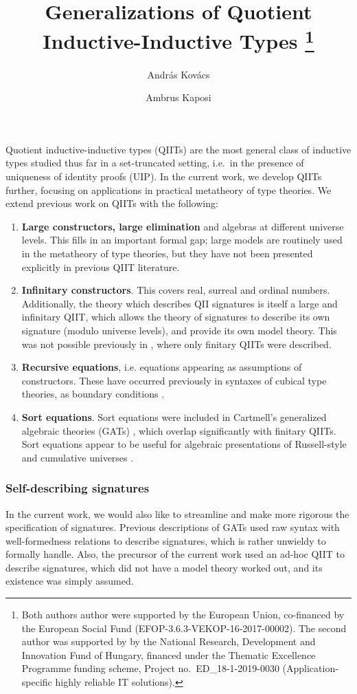 \documentclass{easychair}
\title{Generalizations of Quotient Inductive-Inductive Types %
  \thanks{Both authors author were supported by the European Union, co-financed
    by the European Social Fund (EFOP-3.6.3-VEKOP-16-2017-00002). The second
    author was supported by by the National Research, Development and Innovation
    Fund of Hungary, financed under the Thematic Excellence Programme funding
    scheme, Project no.\ ED\_18-1-2019-0030 (Application-specific highly
    reliable IT solutions). }}
\author{
Andr\'as Kov\'acs
\and
Ambrus Kaposi
}
\institute{
  E\"otv\"os Lor\'and University,
  Budapest, Hungary \\
  \email{kovacsandras|akaposi@inf.elte.hu}
}
\begin{document}
\maketitle

Quotient inductive-inductive types (QIITs) are the most general class of
inductive types studied thus far in a set-truncated setting, i.e.\ in the
presence of uniqueness of identity proofs (UIP). In the current work, we develop
QIITs further, focusing on applications in practical metatheory of type
theories. We extend previous work on QIITs \cite{kaposi2019constructing} with
the following:
\begin{enumerate}
  \item
  \textbf{Large constructors, large elimination} and algebras at different
  universe levels. This fills in an important formal gap; large models are
  routinely used in the metatheory of type theories, but they have not been
  presented explicitly in previous QIIT literature.
  \item
  \textbf{Infinitary constructors}.
  This covers real, surreal \cite{HoTTbook} and ordinal numbers. Additionally,
  the theory which describes QII signatures is itself a large and infinitary
  QIIT, which allows the theory of signatures to describe its own signature
  (modulo universe levels), and provide its own model theory. This was not
  possible previously in \cite{kaposi2019constructing}, where only finitary
  QIITs were described.
  \item
  \textbf{Recursive equations}, i.e. equations appearing as assumptions of
  constructors. These have occurred previously in syntaxes of cubical type
  theories, as boundary conditions \cite{cohen2016cubical,
    angiuli2016computational, angiuli2018cartesian}.
  \item
  \textbf{Sort equations}. Sort equations were included in Cartmell's
  generalized algebraic theories (GATs) \cite{gat}, which overlap significantly
  with finitary QIITs. Sort equations appear to be useful for algebraic
  presentations of Russell-style and cumulative universes
  \cite{sterling2019algebraic}.
\end{enumerate}

\subsubsection*{Self-describing signatures} In the current work, we
would also like to streamline and make more rigorous the specification of
signatures. Previous descriptions of GATs \cite{gat, sterling2019algebraic} used
raw syntax with well-formedness relations to describe signatures, which is
rather unwieldy to formally handle. Also, the precursor of the current work
\cite{kaposi2019constructing} used an ad-hoc QIIT to describe signatures, which
did not have a model theory worked out, and its existence was simply assumed.
\end{document}
